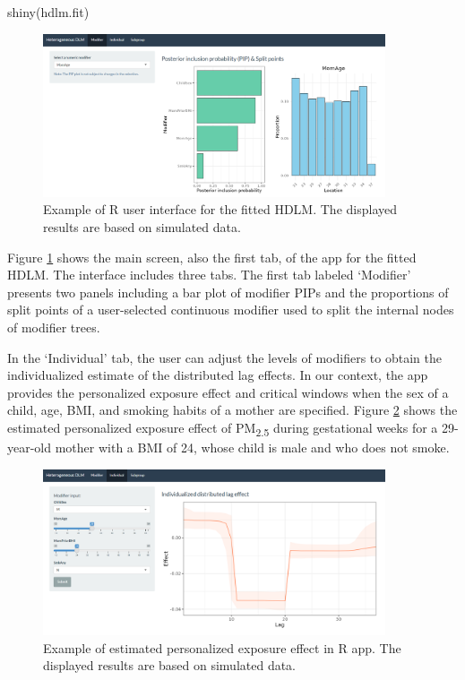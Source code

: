 \begin{example}
shiny(hdlm.fit)
\end{example}

\begin{figure}[ht]
    \centering
    \includegraphics[width=0.9\textwidth]{images/HDLM_Shiny1.png}
    \caption{Example of R  user interface for the fitted HDLM. The displayed results are based on simulated data.}
    \label{fig:hdlm_shiny}
\end{figure}

Figure \ref{fig:hdlm_shiny} shows the main screen, also the first tab, of the  app for the fitted HDLM. The  interface includes three tabs. The first tab labeled `Modifier' presents two panels including a bar plot of modifier PIPs and the proportions of split points of a user-selected continuous modifier used to split the internal nodes of modifier trees.

In the `Individual' tab, the user can adjust the levels of modifiers to obtain the individualized estimate of the distributed lag effects. In our context, the  app provides the personalized exposure effect and critical windows when the sex of a child, age, BMI, and smoking habits of a mother are specified. Figure \ref{fig:hdlm_shiny2} shows the estimated personalized exposure effect of PM\textsubscript{2.5} during gestational weeks for a 29-year-old mother with a BMI of 24, whose child is male and who does not smoke.

\begin{figure}[ht]
    \centering
    \includegraphics[width=0.9\textwidth]{images/HDLM_Shiny2.png}
    \caption{Example of estimated personalized exposure effect in R  app. The displayed results are based on simulated data.}
    \label{fig:hdlm_shiny2}
\end{figure}

